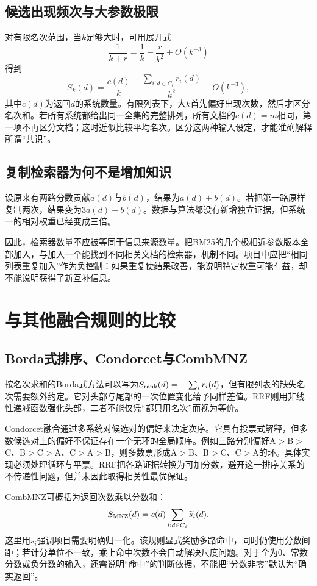 \documentclass[sigconf,nonacm]{acmart}
\begin{document}
\subsection{候选出现频次与大参数极限}
对有限名次范围，当$k$足够大时，可用展开式
\begin{equation}
 \frac1{k+r}=\frac1k-\frac r{k^2}+O(k^{-3})
\end{equation}
得到
\begin{equation}
 S_k(d)=\frac{c(d)}k-\frac{\sum_{i:d\in C_i}r_i(d)}{k^2}
 +O(k^{-3}),
\end{equation}
其中$c(d)$为返回$d$的系统数量。有限列表下，大$k$首先偏好出现次数，然后才区分名次和。若所有系统都给出同一全集的完整排列，所有文档的$c(d)=m$相同，第一项不再区分文档；这时近似比较平均名次。区分这两种输入设定，才能准确解释所谓“共识”。

\subsection{复制检索器为何不是增加知识}
设原来有两路分数贡献$a(d)$与$b(d)$，结果为$a(d)+b(d)$。若把第一路原样复制两次，结果变为$3a(d)+b(d)$。数据与算法都没有新增独立证据，但系统一的相对权重已经变成三倍。

因此，检索器数量不应被等同于信息来源数量。把BM25的几个极相近参数版本全部加入，与加入一个能找到不同相关文档的检索器，机制不同。项目中应把“相同列表重复加入”作为负控制：如果重复使结果改善，能说明特定权重可能有益，却不能说明获得了新互补信息。

\section{与其他融合规则的比较}
\subsection{Borda式排序、Condorcet与CombMNZ}
按名次求和的Borda式方法可以写为$S_{\rm rank}(d)=-\sum_i r_i(d)$，但有限列表的缺失名次需要额外约定。它对头部与尾部的一次位置变化给予同样差值。RRF则用非线性递减函数强化头部，二者不能仅凭“都只用名次”而视为等价。

Condorcet融合通过多系统对候选对的偏好来决定次序。它具有投票式解释，但多数候选对上的偏好不保证存在一个无环的全局顺序。例如三路分别偏好A$>$B$>$C、B$>$C$>$A、C$>$A$>$B，则多数票形成A$>$B、B$>$C、C$>$A的环。具体实现必须处理循环与平票。RRF把各路证据转换为可加分数，避开这一排序关系的不传递性问题，但并未因此取得相关性最优保证。

CombMNZ可概括为返回次数乘以分数和：
\begin{equation}
 S_{\rm MNZ}(d)=c(d)\sum_{i:d\in C_i}\widetilde s_i(d).
\end{equation}
这里用$\widetilde s_i$强调项目需要明确归一化。该规则显式奖励多路命中，同时仍使用分数间距；若计分单位不一致，乘上命中次数不会自动解决尺度问题。对于全为0、常数分数或负分数的输入，还需说明“命中”的判断依据，不能把“分数非零”默认为“确实返回”。
\end{document}
